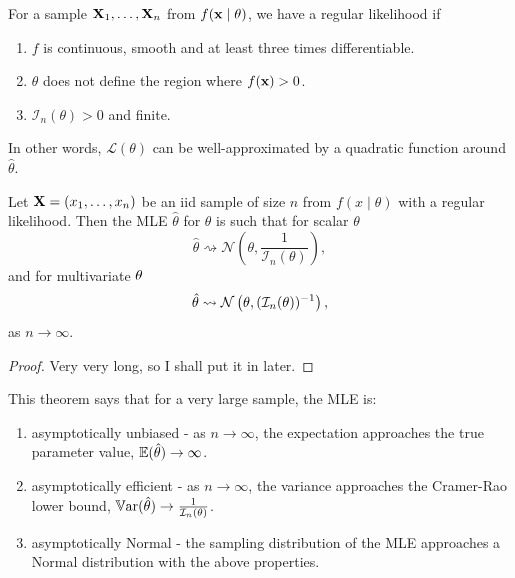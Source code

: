 \documentclass[10pt, a4paper]{article}
\begin{document}
\begin{definition}
    For a sample $\mathbf{X}_1, \dotsc, \mathbf{X}_n$ from $f(\mathbf{x} \mid \mathbf{\theta})$,
    we have a regular likelihood if
    \begin{enumerate}
        \item $f$ is continuous,
        smooth and at least three times differentiable.

        \item $\theta$ does not define the region where $f(\mathbf{x}) > 0$.

        \item $\mathcal{I}_n(\theta) > 0$ and finite.
    \end{enumerate}
    In other words,
    $\mathcal{L}(\theta)$ can be well-approximated by a quadratic function around $\hat{\theta}$.
\end{definition}

\begin{theorem}
    Let $\mathbf{X} = (x_1, \dotsc, x_n)$ be an iid sample of size $n$ from $f(x \mid \theta)$ with a regular likelihood.
    Then the MLE $\hat{\theta}$ for $\theta$ is such that for scalar $\theta$
    \[
    \hat{\theta} \rightsquigarrow \mathcal{N}\left(\theta, \frac{1}{\mathcal{I}_n(\theta)}\right),
    \]
    and for multivariate $\mathbf{\theta}$
    \[
    \hat{\mathbf{\theta}} \rightsquigarrow \mathcal{N}\left(\mathbf{\theta}, (\mathcal{I}_n(\mathbf{\theta})) ^ {-1}\right),
    \]
    as $n \to \infty$.

    \begin{proof}
        Very very long,
        so I shall put it in later.
    \end{proof}
\end{theorem}

This theorem says that for a very large sample,
the MLE is:

\begin{enumerate}[label = (\roman*)]
    \item asymptotically unbiased - as $n \to \infty$,
    the expectation approaches the true parameter value,
    $\mathbb{E}(\hat{\theta}) \to \infty$.

    \item asymptotically efficient - as $n \to \infty$,
    the variance approaches the Cramer-Rao lower bound,
    $\mathbb{V}\mathrm{ar}(\hat{\theta}) \to \frac{1}{\mathcal{I}_n(\theta)}$.

    \item asymptotically Normal - the sampling distribution of the MLE approaches a Normal distribution with the above properties.
\end{enumerate}
\end{document}
